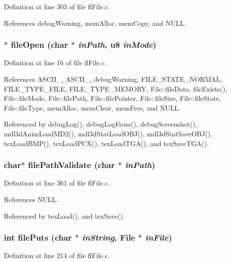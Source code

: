 Definition at line 303 of file fl\-File.c.

References debug\-Warning, mem\-Alloc, mem\-Copy, and NULL.
\subsubsection{$\ast$ file\-Open (char $\ast$ {\em in\-Path}, u8 {\em in\-Mode})}\label{flFile_8c_c93941480776a7835fc0b7eec7ebea85}




Definition at line 16 of file fl\-File.c.

References ASCII\_, ASCII\_, debug\-Warning, FILE\_\-STATE\_\-NORMAL, FILE\_\-TYPE\_\-FILE, FILE\_\-TYPE\_\-MEMORY, File::file\-Data, file\-Exists(), File::file\-Mode, File::file\-Path, File::file\-Pointer, File::file\-Size, File::file\-State, File::file\-Type, mem\-Alloc, mem\-Clear, mem\-Free, and NULL.

Referenced by debug\-Log(), debug\-Log\-From(), debug\-Screenshot(), mdl3d\-Anim\-Load\-MD2(), mdl3d\-Stat\-Load\-OBJ(), mdl3d\-Stat\-Save\-OBJ(), tex\-Load\-BMP(), tex\-Load\-PCX(), tex\-Load\-TGA(), and tex\-Save\-TGA().
\subsubsection{\setlength{\rightskip}{0pt plus 5cm}char$\ast$ file\-Path\-Validate (char $\ast$ {\em in\-Path})}\label{flFile_8c_0dad80defd73606d8e58ae85ec6bf68b}




Definition at line 361 of file fl\-File.c.

References NULL.

Referenced by tex\-Load(), and tex\-Save().
\subsubsection{\setlength{\rightskip}{0pt plus 5cm}int file\-Puts (char $\ast$ {\em in\-String}, {\bf File} $\ast$ {\em in\-File})}\label{flFile_8c_d30509e008ced313861416066057940d}




Definition at line 214 of file fl\-File.c.

